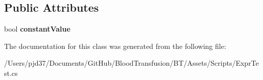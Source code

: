 \subsection*{Public Attributes}
\begin{DoxyCompactItemize}
\item 
bool {\bfseries constant\+Value}\hypertarget{class_b83_1_1_logic_expression_parser_1_1_constant_bool_ac4ddaec7c5f46361e3277494cdf244bb}{}\label{class_b83_1_1_logic_expression_parser_1_1_constant_bool_ac4ddaec7c5f46361e3277494cdf244bb}

\end{DoxyCompactItemize}


The documentation for this class was generated from the following file\+:\begin{DoxyCompactItemize}
\item 
/\+Users/pjd37/\+Documents/\+Git\+Hub/\+Blood\+Transfusion/\+B\+T/\+Assets/\+Scripts/Expr\+Test.\+cs\end{DoxyCompactItemize}
